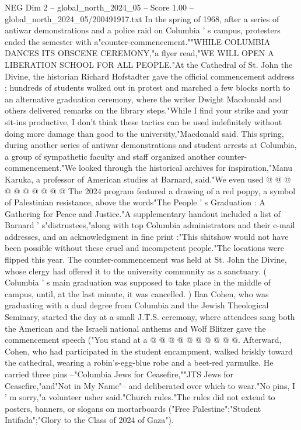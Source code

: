 \begin{textsample}{NEG Dim 2 – global\_north\_2024\_05 – Score 1.00 – global\_north\_2024\_05/200491917.txt}  \label{ex:f2_neg_054}
In the spring of 1968, after a series of antiwar demonstrations and a police raid on Columbia ' s campus, protesters ended the semester with a"counter-commencement.""WHILE COLUMBIA DANCES ITS OBSCENE CEREMONY,"a flyer read,"WE WILL OPEN A LIBERATION SCHOOL FOR ALL PEOPLE."At the Cathedral of St.
John the Divine, the historian Richard Hofstadter gave the official commencement address ; hundreds of students walked out in protest and marched a few blocks north to an alternative graduation ceremony, where the writer Dwight Macdonald and others delivered remarks on the library steps."While I find your strike and your sit-ins productive, I don't think these tactics can be used indefinitely without doing more damage than good to the university,"Macdonald said.
This spring, during another series of antiwar demonstrations and student arrests at Columbia, a group of sympathetic faculty and staff organized another counter-commencement."We looked through the historical archives for inspiration,"Manu Karuka, a professor of American studies at Barnard, said."We even used @ @ @ @ @ @ @ @ @ @ The 2024 program featured a drawing of a red poppy, a symbol of Palestinian resistance, above the words"The People ' s Graduation : A Gathering for Peace and Justice."A supplementary handout included a list of Barnard ' s"distrustees,"along with top Columbia administrators and their e-mail addresses, and an acknowledgment in fine print :"This shitshow would not have been possible without these cruel and incompetent people."The locations were flipped this year.
The counter-commencement was held at St.
John the Divine, whose clergy had offered it to the university community as a sanctuary. ( Columbia ' s main graduation was supposed to take place in the middle of campus, until, at the last minute, it was cancelled. ) Ilan Cohen, who was graduating with a dual degree from Columbia and the Jewish Theological Seminary, started the day at a small J.T.S. ceremony, where attendees sang both the American and the Israeli national anthems and Wolf Blitzer gave the commencement speech ("You stand at a @ @ @ @ @ @ @ @ @ @.
Afterward, Cohen, who had participated in the student encampment, walked briskly toward the cathedral, wearing a robin's-egg-blue robe and a beet-red yarmulke.
He carried three pins --"Columbia Jews for Ceasefire,""JTS Jews for Ceasefire,"and"Not in My Name"-- and deliberated over which to wear."No pins, I ' m sorry,"a volunteer usher said."Church rules."The rules did not extend to posters, banners, or slogans on mortarboards ("Free Palestine";"Student Intifada";"Glory to the Class of 2024 of Gaza").

\end{textsample}
